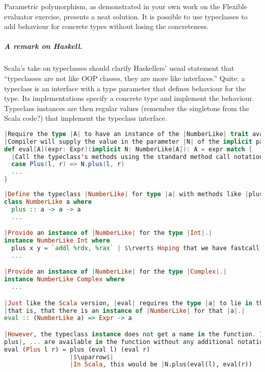 \documentclass[10 pt]{article}
\begin{document}
Parametric polymorphism, as demonstrated in your own work on the Flexible evaluator exercise, presents a neat solution. It is possible to use typeclasses to add behaviour for concrete types without losing the concreteness.

\subparagraph{A remark on Haskell.} Scala's take on typeclasses should clarify Haskellers' usual statement that ``typeclasses are not like OOP classes, they are more like interfaces.'' Quite: a typeclass is an interface with a type parameter that defines behaviour for the type. Its implementations specify a concrete type and implement the behaviour. Typeclass instances are then regular values (remember the singletons from the Scala code?) that implement the typeclass interface.

\begin{lstlisting}[language=Scala, escapechar=|]
|Require the type |A| to have an instance of the |NumberLike| trait available for it.|
|Compiler will supply the value in the parameter |N| of the implicit parameter list.|
def eval[A](expr: Expr)(implicit N: NumberLike[A]): A = expr match {
  |Call the typeclass's methods using the standard method call notation.|
  case Plus(l, r) => N.plus(l, r)
  ...
}
\end{lstlisting}

\begin{lstlisting}[language=Haskell, escapechar=|]
|Define the typeclass |NumberLike| for type |a| with methods like |plus|, ... .|
class NumberLike a where
  plus :: a -> a -> a
  ...

|Provide an instance of |NumberLike| for the type |Int|.|
instance NumberLike Int where
  plus x y = `addl %rdx, %rax` | $\rvert$ Hoping that we have fastcall convention and the parameters are in |%rax| and |%rdx|.|
  ...

|Provide an instance of |NumberLike| for the type |Complex|.|
instance NumberLike Complex where
  ...

|Just like the Scala version, |eval| requires the type |a| to lie in the |NumberLike| typeclass;|
|that is, that there is an instance of |NumberLike| for that |a|.|
eval :: (NumberLike a) => Expr -> a

|However, the typeclass instance does not get a name in the function. Instead, all its functions|
plus|, ... are available in the function without any additional notation.|
eval (Plus l r) = plus (eval l) (eval r)
                  |$\uparrow$|
                  |In Scala, this would be |N.plus(eval(l), eval(r))
\end{lstlisting}
\end{document}
